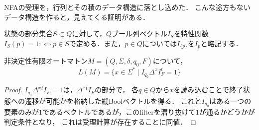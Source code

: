 \begin{tcolorbox}[colframe=ForestGreen, colback=ForestGreen!10!white, breakable]
    NFAの受理を，行列とその積のデータ構造に落とし込めた．
    こんな途方もないデータ構造を作ると，見えてくる証明がある．
\end{tcolorbox}

\begin{notation}
    状態の部分集合$S\subset Q$に対して，$Q$ブール列ベクトル$I_S$を特性関数$I_S(p)=1:\Leftrightarrow p\in S$で定める．また，$p\in Q$については$I_{\{p\}}$を$I_p$と略記する．
\end{notation}

\begin{corollary}
    非決定性有限オートマトン$M=(Q,\Sigma,\delta,q_0,F)$について，
    \[ L(M)=\{x\in\Sigma^*\mid I_{q_0}\Delta^xI^t_F=1\} \]
\end{corollary}
\begin{proof}
    $I_{q_0}\Delta^x{}^t\!I_F=1$は，$\Delta^x{}^t\!I_F$の部分で，
    各$q\in Q$から$x$を読み込むことで終了状態への遷移が可能かを格納した縦Boolベクトルを得る．
    これと$I_{q_0}$はある一つの要素のみが$1$であるベクトルであるが，このfilterを潜り抜けて$1$が通るかどうかが判定条件となり，
    これは受理計算が存在することに同値．
\end{proof}

